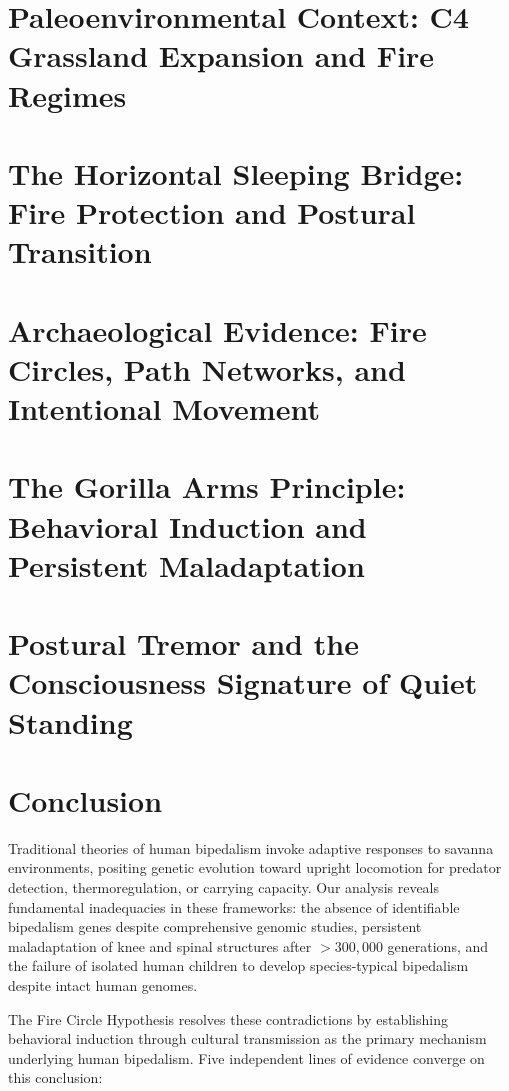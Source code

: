 \documentclass[12pt,a4paper]{article}
\begin{document}
\section{Paleoenvironmental Context: C4 Grassland Expansion and Fire Regimes}


\section{The Horizontal Sleeping Bridge: Fire Protection and Postural Transition}


\section{Archaeological Evidence: Fire Circles, Path Networks, and Intentional Movement}


\section{The Gorilla Arms Principle: Behavioral Induction and Persistent Maladaptation}


\section{Postural Tremor and the Consciousness Signature of Quiet Standing}


\section{Conclusion}

Traditional theories of human bipedalism invoke adaptive responses to savanna environments, positing genetic evolution toward upright locomotion for predator detection, thermoregulation, or carrying capacity. Our analysis reveals fundamental inadequacies in these frameworks: the absence of identifiable bipedalism genes despite comprehensive genomic studies, persistent maladaptation of knee and spinal structures after $>300,000$ generations, and the failure of isolated human children to develop species-typical bipedalism despite intact human genomes.

The Fire Circle Hypothesis resolves these contradictions by establishing behavioral induction through cultural transmission as the primary mechanism underlying human bipedalism. Five independent lines of evidence converge on this conclusion:
\end{document}
